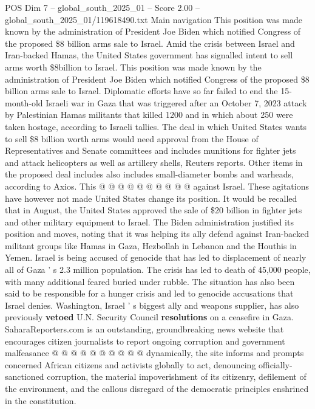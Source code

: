 \begin{textsample}{POS Dim 7 – global\_south\_2025\_01 – Score 2.00 – global\_south\_2025\_01/119618490.txt}  \label{ex:f7_pos_254}
Main navigation This position was made known by the administration of President Joe Biden which notified Congress of the proposed \$8 billion arms sale to Israel.
Amid the crisis between Israel and Iran-backed Hamas, the United States government has signalled intent to sell arms worth \$8billion to Israel.
This position was made known by the administration of President Joe Biden which notified Congress of the proposed \$8 billion arms sale to Israel.
Diplomatic efforts have so far failed to end the 15-month-old Israeli war in Gaza that was triggered after an October 7, 2023 attack by Palestinian Hamas militants that killed 1200 and in which about 250 were taken hostage, according to Israeli tallies.
The deal in which United States wants to sell \$8 billion worth arms would need approval from the House of Representatives and Senate committees and includes munitions for fighter jets and attack helicopters as well as artillery shells, Reuters reports.
Other items in the proposed deal includes also includes small-diameter bombs and warheads, according to Axios.
This @ @ @ @ @ @ @ @ @ @ against Israel.
These agitations have however not made United States change its position.
It would be recalled that in August, the United States approved the sale of \$20 billion in fighter jets and other military equipment to Israel.
The Biden administration justified its position and moves, noting that it was helping its ally defend against Iran-backed militant groups like Hamas in Gaza, Hezbollah in Lebanon and the Houthis in Yemen.
Israel is being accused of genocide that has led to displacement of nearly all of Gaza ' s 2.3 million population.
The crisis has led to death of 45,000 people, with many additional feared buried under rubble.
The situation has also been said to be responsible for a hunger crisis and led to genocide accusations that Israel denies.
Washington, Israel ' s biggest ally and weapons supplier, has also previously \textbf{vetoed} U.N.
Security Council \textbf{resolutions} on a ceasefire in Gaza.
SaharaReporters.com is an outstanding, groundbreaking news website that encourages citizen journalists to report ongoing corruption and government malfeasance @ @ @ @ @ @ @ @ @ @ dynamically, the site informs and prompts concerned African citizens and activists globally to act, denouncing officially-sanctioned corruption, the material impoverishment of its citizenry, defilement of the environment, and the callous disregard of the democratic principles enshrined in the constitution.

\end{textsample}
